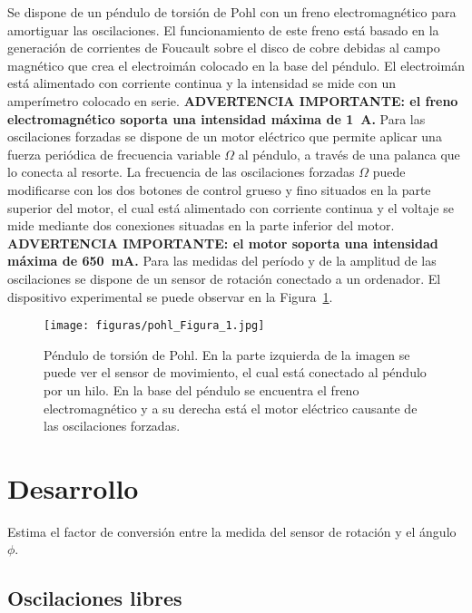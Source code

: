 \documentclass[11pt]{articulo}
\begin{document}
Se dispone de un p\'endulo de torsi\'on de Pohl con un freno electromagn\'etico para amortiguar las oscilaciones. El funcionamiento de este freno est\'a basado en la generaci\'on de corrientes de Foucault sobre el disco de cobre debidas al campo magn\'etico que crea el electroim\'an colocado en la base del p\'endulo. El electroim\'an est\'a alimentado con corriente continua y la intensidad se mide con un amper\'imetro colocado en serie. {\bf ADVERTENCIA IMPORTANTE: el freno electromagn\'etico soporta una intensidad m\'axima de 1~A.} Para las oscilaciones forzadas se dispone de un motor el\'ectrico que permite aplicar una fuerza peri\'odica de frecuencia variable $\Omega$ al p\'endulo, a trav\'es de una palanca que lo conecta al resorte. La frecuencia de las oscilaciones forzadas $\Omega$ puede modificarse con los dos botones de control grueso y fino situados en la parte superior del motor, el cual est\'a alimentado con corriente continua y el voltaje se mide mediante dos conexiones situadas en la parte inferior del motor. {\bf ADVERTENCIA IMPORTANTE: el motor soporta una intensidad m\'axima de 650~mA.} Para las medidas del per\'iodo y de la amplitud de las oscilaciones se dispone de un sensor de rotaci\'on conectado a un ordenador. El dispositivo experimental se puede observar en la Figura~\ref{pohl}.
%
\begin{figure}[htb]
\begin{center}
\hspace*{0.0cm}
\texttt{[image: figuras/pohl\_Figura\_1.jpg]}
\end{center}
\vspace*{-0.6cm}
\caption[]{\label{pohl}{P\'endulo de torsi\'on de Pohl. En la parte izquierda de la imagen se puede ver el sensor de movimiento, el cual est\'a conectado al p\'endulo por un hilo. En la base del p\'endulo se encuentra el freno electromagn\'etico y a su derecha est\'a el motor el\'ectrico causante de las oscilaciones forzadas.}}
\end{figure}


\section{Desarrollo}

Estima el factor de conversi\'on entre la medida del sensor de rotaci\'on y el \'angulo $\phi$.

\subsection{Oscilaciones libres}
\end{document}
